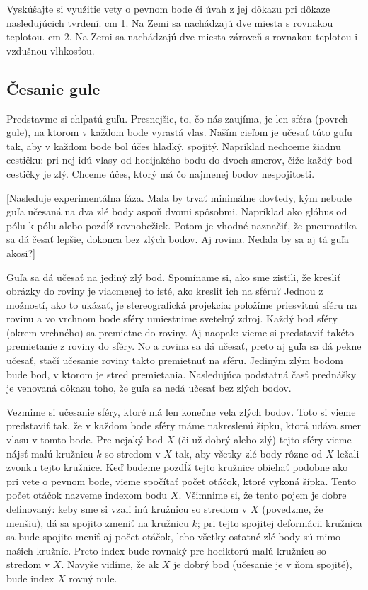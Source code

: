 \documentclass[a4paper]{article}
\begin{document}
Vyskúšajte si využitie vety o pevnom bode či úvah z jej dôkazu pri dôkaze nasledujúcich tvrdení.\hfil\break
\hbox{} cm 1. Na Zemi sa nachádzajú dve miesta s rovnakou teplotou.\hfil\break
\hbox{} cm 2. Na Zemi sa nachádzajú dve miesta zároveň s rovnakou teplotou i vzdušnou vlhkosťou.

\subsection*{Česanie gule}

Predstavme si chlpatú guľu. Presnejšie, to, čo nás zaujíma, je len sféra (povrch gule), na ktorom v každom bode vyrastá vlas. Naším cieľom je učesať túto guľu tak, aby v každom bode bol účes hladký, spojitý. Napríklad nechceme žiadnu cestičku: pri nej idú vlasy od hocijakého bodu do dvoch smerov, čiže každý bod cestičky je zlý. Chceme účes, ktorý má čo najmenej bodov nespojitosti.

[Nasleduje experimentálna fáza. Mala by trvať minimálne dovtedy, kým nebude guľa učesaná na dva zlé body aspoň dvomi spôsobmi. Napríklad ako glóbus od pólu k pólu alebo pozdĺž rovnobežiek. Potom je vhodné naznačiť, že pneumatika sa dá česať lepšie, dokonca bez zlých bodov. Aj rovina. Nedala by sa aj tá guľa akosi?]

Guľa sa dá učesať na jediný zlý bod. Spomíname si, ako sme zistili, že kresliť obrázky do roviny je viacmenej to isté, ako kresliť ich na sféru? Jednou z možností, ako to ukázať, je stereografická projekcia: položíme priesvitnú sféru na rovinu a vo vrchnom bode sféry umiestnime svetelný zdroj. Každý bod sféry (okrem vrchného) sa premietne do roviny. Aj naopak: vieme si predstaviť takéto premietanie z roviny do sféry. No a rovina sa dá učesať, preto aj guľa sa dá pekne učesať, stačí učesanie roviny takto premietnuť na sféru. Jediným zlým bodom bude bod, v ktorom je stred premietania. Nasledujúca podstatná časť prednášky je venovaná dôkazu toho, že guľa sa nedá učesať bez zlých bodov.

Vezmime si učesanie sféry, ktoré má len konečne veľa zlých bodov. Toto si vieme predstaviť tak, že v každom bode sféry máme nakreslenú šípku, ktorá udáva smer vlasu v tomto bode. Pre nejaký bod $X$ (či už dobrý alebo zlý) tejto sféry vieme nájsť malú kružnicu $k$ so stredom v $X$ tak, aby všetky zlé body rôzne od $X$ ležali zvonku tejto kružnice. Keď budeme pozdĺž tejto kružnice obiehať podobne ako pri vete o pevnom bode, vieme spočítať počet otáčok, ktoré vykoná šípka. Tento počet otáčok nazveme indexom bodu $X$. Všimnime si, že tento pojem je dobre definovaný: keby sme si vzali inú kružnicu so stredom v $X$ (povedzme, že menšiu), dá sa spojito zmeniť na kružnicu $k$; pri tejto spojitej deformácii kružnica sa bude spojito meniť aj počet otáčok, lebo všetky ostatné zlé body sú mimo našich kružníc. Preto index bude rovnaký pre hociktorú malú kružnicu so stredom v $X$. Navyše vidíme, že ak $X$ je dobrý bod (učesanie je v ňom spojité), bude index $X$ rovný nule.
\end{document}
